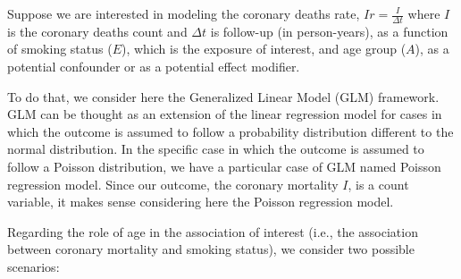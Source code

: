 \documentclass[a4paper,10pt]{article}\usepackage[]{graphicx}\usepackage[]{xcolor}
\begin{document}
Suppose we are interested in modeling the coronary deaths rate, $Ir=\frac{I}{\Delta t}$ where $I$ is the coronary deaths count and $\Delta t$ is follow-up (in person-years), as a function of smoking status ($E$), which is the exposure of interest, and age group ($A$), as a potential confounder or as a potential effect modifier. 

To do that, we consider here the Generalized Linear Model (GLM) framework. GLM can be thought as an extension of the linear regression model for cases in which the outcome is assumed to follow a probability distribution different to the normal distribution. In the specific case in which the outcome is assumed to follow a Poisson distribution, we have a particular case of GLM named Poisson regression model. Since our outcome, the coronary mortality $I$, is a count variable, it makes sense considering here the Poisson regression model.

Regarding the role of age in the association of interest (i.e., the association between coronary mortality and smoking status), we consider two possible scenarios:
\end{document}
